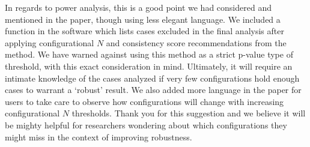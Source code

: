 \documentclass[12pt,stdletter,dateno,sigleft]{newlfm} %
\begin{document}
\begin{newlfm}
In regards to power analysis, this is a good point we had considered and mentioned in the paper, though using less elegant language. We included a function in the software which lists cases excluded in the final analysis after applying configurational $N$ and consistency score recommendations from the method. We have warned against using this method as a strict p-value type of threshold, with this exact consideration in mind. Ultimately, it will require an intimate knowledge of the cases analyzed if very few configurations hold enough cases to warrant a `robust' result. We also added more language in the paper for users to take care to observe how configurations will change with increasing configurational $N$ thresholds. Thank you for this suggestion and we believe it will be mighty helpful for researchers wondering about which configurations they might miss in the context of improving robustness.  \newline





\end{newlfm}
\end{document}
